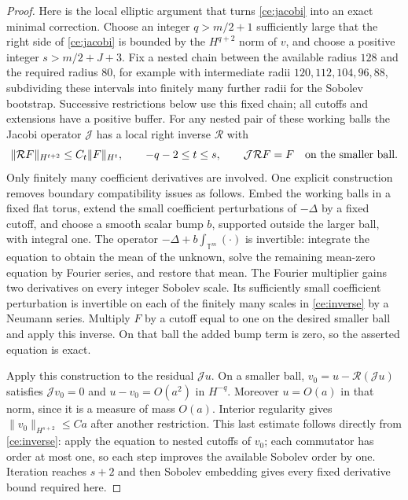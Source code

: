 \begin{proof}
Here is the local elliptic argument that turns \eqref{ce:jacobi} into an
exact minimal correction.  Choose an integer $q>m/2+1$ sufficiently
large that the right side of \eqref{ce:jacobi} is bounded by the
$H^{q+2}$ norm of $v$, and choose a positive integer $s>m/2+J+3$.
Fix a nested chain between the available radius $128$ and the required
radius $80$, for example with intermediate radii $120,112,104,96,88$,
subdividing these intervals into finitely many further radii for the
Sobolev bootstrap. Successive restrictions below use this fixed chain;
all cutoffs and extensions have a positive buffer.
For any nested pair of these working balls the Jacobi operator
$\mathcal J$ has a local right inverse $\mathcal R$ with
\begin{equation}
 \label{ce:inverse}
 \|\mathcal RF\|_{H^{t+2}}
       \le C_t\|F\|_{H^t},\qquad -q-2\le t\le s,
 \qquad \mathcal J\mathcal RF=F
 \quad\hbox{on the smaller ball}.
\end{equation}
Only finitely many coefficient derivatives are involved.  One explicit
construction removes boundary compatibility issues as follows.  Embed
the working balls in a fixed flat torus, extend the small coefficient
perturbations of $-\Delta$ by a fixed cutoff, and choose a smooth scalar
bump $b$, supported outside the larger ball, with integral one.  The
operator
$-\Delta+b\int_{\mathbb T^m}(\cdot)$ is invertible: integrate the
equation to obtain the mean of the unknown, solve the remaining
mean-zero equation by Fourier series, and restore that mean.  The
Fourier multiplier gains two derivatives on every integer Sobolev
scale.  Its sufficiently small coefficient perturbation is invertible
on each of the finitely many scales in \eqref{ce:inverse} by a Neumann
series.  Multiply $F$ by a cutoff equal to one on the desired smaller
ball and apply this inverse.  On that ball the added bump term is zero,
so the asserted equation is exact.

Apply this construction to the residual $\mathcal Ju$.  On a smaller
ball,
$v_0=u-\mathcal R(\mathcal Ju)$ satisfies $\mathcal Jv_0=0$ and
$u-v_0=O(a^2)$ in $H^{-q}$.  Moreover $u=O(a)$ in that norm, since it
is a measure of mass $O(a)$.  Interior regularity gives
$\|v_0\|_{H^{s+2}}\le Ca$ after another restriction.  This last
estimate follows directly from \eqref{ce:inverse}: apply the equation
to nested cutoffs of $v_0$; each commutator has order at most one, so
each step improves the available Sobolev order by one.  Iteration
reaches $s+2$ and then Sobolev embedding gives every fixed derivative
bound required here.


\end{proof}
